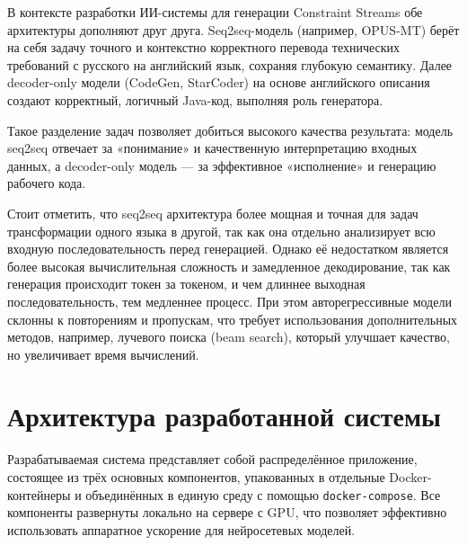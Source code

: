 В контексте разработки ИИ-системы для генерации Constraint Streams обе архитектуры дополняют друг друга. Seq2seq-модель (например, OPUS-MT) берёт на себя задачу точного и контекстно корректного перевода технических требований с русского на английский язык, сохраняя глубокую семантику. Далее decoder-only модели (CodeGen, StarCoder) на основе английского описания создают корректный, логичный Java-код, выполняя роль генератора.

Такое разделение задач позволяет добиться высокого качества результата: модель seq2seq отвечает за «понимание» и качественную интерпретацию входных данных, а decoder-only модель — за эффективное «исполнение» и генерацию рабочего кода.

Стоит отметить, что seq2seq архитектура более мощная и точная для задач трансформации одного языка в другой, так как она отдельно анализирует всю входную последовательность перед генерацией. Однако её недостатком является более высокая вычислительная сложность и замедленное декодирование, так как генерация происходит токен за токеном, и чем длиннее выходная последовательность, тем медленнее процесс. При этом авторегрессивные модели склонны к повторениям и пропускам, что требует использования дополнительных методов, например, лучевого поиска (beam search), который улучшает качество, но увеличивает время вычислений.
\section{Архитектура разработанной системы}

Разрабатываемая система представляет собой распределённое приложение, состоящее из трёх основных компонентов, упакованных в отдельные Docker-контейнеры и объединённых в единую среду с помощью \texttt{docker-compose}. Все компоненты развернуты локально на сервере с GPU, что позволяет эффективно использовать аппаратное ускорение для нейросетевых моделей.

